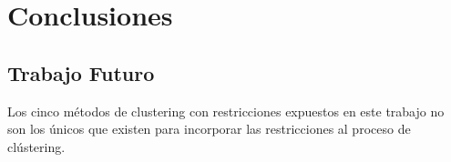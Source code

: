 \chapter{Conclusiones}\label{ch:Conclusiones}

\section{Trabajo Futuro}

Los cinco métodos de clustering con restricciones expuestos en este trabajo no son los únicos que existen para incorporar las restricciones al proceso de clústering. 